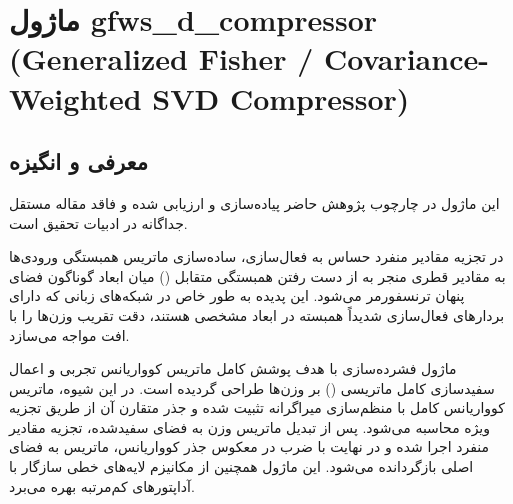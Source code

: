 \section{ماژول gfws\_d\_compressor (Generalized Fisher / Covariance-Weighted SVD Compressor)}
\label{sec:module_gfws_d_compressor}

\subsection{معرفی و انگیزه}
این ماژول در چارچوب پژوهش حاضر پیاده‌سازی و ارزیابی شده و فاقد مقاله مستقل جداگانه در ادبیات تحقیق است.

در تجزیه مقادیر منفرد حساس به فعال‌سازی، ساده‌سازی ماتریس همبستگی ورودی‌ها به مقادیر قطری منجر به از دست رفتن همبستگی متقابل () میان ابعاد گوناگون فضای پنهان ترنسفورمر می‌شود. این پدیده به طور خاص در شبکه‌های زبانی که دارای بردارهای فعال‌سازی شدیداً همبسته در ابعاد مشخصی هستند، دقت تقریب وزن‌ها را با افت مواجه می‌سازد.

ماژول فشرده‌سازی  با هدف پوشش کامل ماتریس کوواریانس تجربی و اعمال سفیدسازی کامل ماتریسی () بر وزن‌ها طراحی گردیده است. در این شیوه، ماتریس کوواریانس کامل با منظم‌سازی میراگرانه تثبیت شده و جذر متقارن آن از طریق تجزیه ویژه محاسبه می‌شود. پس از تبدیل ماتریس وزن به فضای سفیدشده، تجزیه مقادیر منفرد اجرا شده و در نهایت با ضرب در معکوس جذر کوواریانس، ماتریس به فضای اصلی بازگردانده می‌شود. این ماژول همچنین از مکانیزم لایه‌های خطی سازگار با آداپتورهای کم‌مرتبه  بهره می‌برد.

